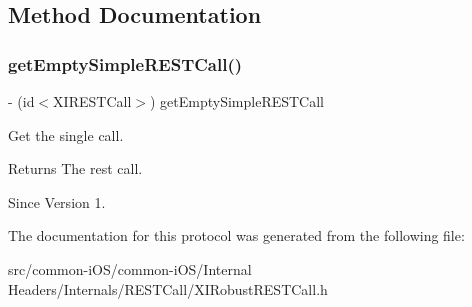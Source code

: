 \subsection{Method Documentation}
\hypertarget{protocol_x_i_robust_r_e_s_t_call_simple_call_provider-p_afcb9112b7b1b748b0f2c6fe7b279f96b}{}\label{protocol_x_i_robust_r_e_s_t_call_simple_call_provider-p_afcb9112b7b1b748b0f2c6fe7b279f96b} 
\subsubsection{\texorpdfstring{get\+Empty\+Simple\+R\+E\+S\+T\+Call()}{getEmptySimpleRESTCall()}}
{\footnotesize\ttfamily -\/ (id$<$X\+I\+R\+E\+S\+T\+Call$>$) get\+Empty\+Simple\+R\+E\+S\+T\+Call \begin{DoxyParamCaption}{ }\end{DoxyParamCaption}}



Get the single call. 

\begin{DoxyReturn}{Returns}
The rest call. 
\end{DoxyReturn}
\begin{DoxySince}{Since}
Version 1. 
\end{DoxySince}


The documentation for this protocol was generated from the following file\+:\begin{DoxyCompactItemize}
\item 
src/common-\/i\+O\+S/common-\/i\+O\+S/\+Internal Headers/\+Internals/\+R\+E\+S\+T\+Call/X\+I\+Robust\+R\+E\+S\+T\+Call.\+h\end{DoxyCompactItemize}
